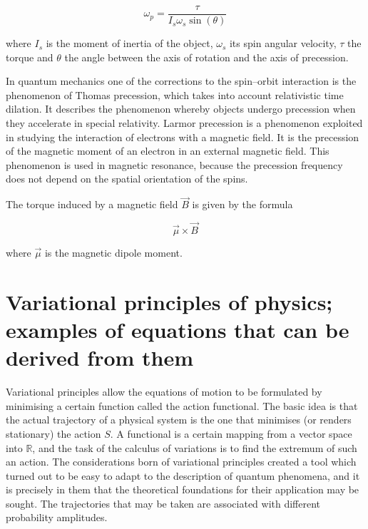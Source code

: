 \begin{equation}
    \omega_p = \frac{\tau}{I_s\omega_s\sin(\theta)}
\end{equation}

where $I_s$ is the moment of inertia of the object, $\omega_s$ its spin angular velocity, $\tau$ the torque and $\theta$ the angle between the axis of rotation and the axis of precession.

In quantum mechanics one of the corrections to the spin--orbit interaction is the phenomenon of Thomas precession, which takes into account relativistic time dilation. It describes the phenomenon whereby objects undergo precession when they accelerate in special relativity. Larmor precession is a phenomenon exploited in studying the interaction of electrons with a magnetic field. It is the precession of the magnetic moment of an electron in an external magnetic field. This phenomenon is used in magnetic resonance, because the precession frequency does not depend on the spatial orientation of the spins.

The torque induced by a magnetic field $\vec{B}$ is given by the formula

\begin{equation}
    \vec{\mu}\times \vec{B}
\end{equation}

where $\vec{\mu}$ is the magnetic dipole moment.

\section{Variational principles of physics; examples of equations that can be derived from them}

Variational principles allow the equations of motion to be formulated by minimising a certain function called the action functional. The basic idea is that the actual trajectory of a physical system is the one that minimises (or renders stationary) the action $S$. A functional is a certain mapping from a vector space into $\mathbb{R}$, and the task of the calculus of variations is to find the extremum of such an action. The considerations born of variational principles created a tool which turned out to be easy to adapt to the description of quantum phenomena, and it is precisely in them that the theoretical foundations for their application may be sought. The trajectories that may be taken are associated with different probability amplitudes.

